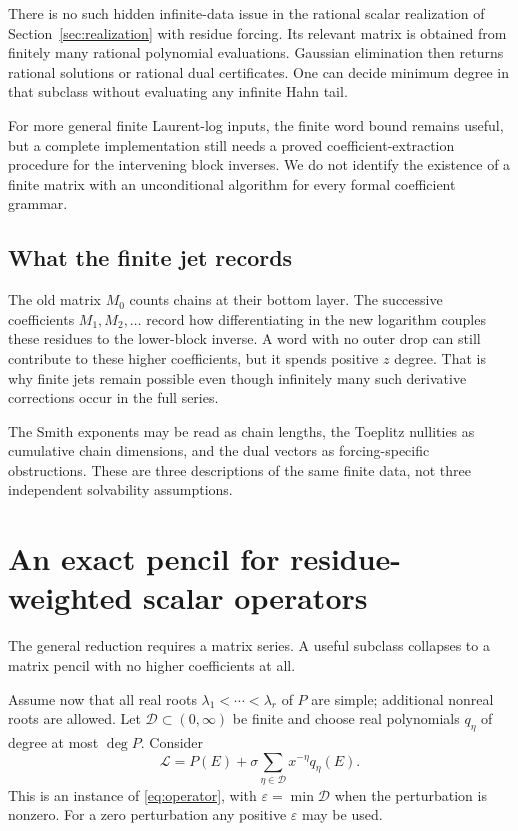 \documentclass[11pt,a4paper]{article}
\numberwithin{equation}{section}
\theoremstyle{definition}
\theoremstyle{remark}
\theoremstyle{definition}
\newcommand{\Ll}{\mathcal L}
\newcommand{\eps}{\varepsilon}
\begin{document}
There is no such hidden infinite-data issue in the rational scalar realization of Section~\ref{sec:realization} with residue forcing. Its relevant matrix is obtained from finitely many rational polynomial evaluations. Gaussian elimination then returns rational solutions or rational dual certificates. One can decide minimum degree in that subclass without evaluating any infinite Hahn tail.

For more general finite Laurent-log inputs, the finite word bound remains useful, but a complete implementation still needs a proved coefficient-extraction procedure for the intervening block inverses. We do not identify the existence of a finite matrix with an unconditional algorithm for every formal coefficient grammar.

\subsection{What the finite jet records}
The old matrix $M_0$ counts chains at their bottom layer. The successive coefficients $M_1,M_2,\ldots$ record how differentiating in the new logarithm couples these residues to the lower-block inverse. A word with no outer drop can still contribute to these higher coefficients, but it spends positive $z$ degree. That is why finite jets remain possible even though infinitely many such derivative corrections occur in the full series.

The Smith exponents may be read as chain lengths, the Toeplitz nullities as cumulative chain dimensions, and the dual vectors as forcing-specific obstructions. These are three descriptions of the same finite data, not three independent solvability assumptions.

\section{An exact pencil for residue-weighted scalar operators}
\label{sec:pencil}
The general reduction requires a matrix series. A useful subclass collapses to a matrix pencil with no higher coefficients at all.

Assume now that all real roots $\lambda_1<\cdots<\lambda_r$ of $P$ are simple; additional nonreal roots are allowed. Let $\mathcal D\subset(0,\infty)$ be finite and choose real polynomials $q_\eta$ of degree at most $\deg P$. Consider
\begin{equation}
 \Ll=P(E)+\sigma\sum_{\eta\in\mathcal D}x^{-\eta}q_\eta(E).
 \label{eq:residue-class}
\end{equation}
This is an instance of \eqref{eq:operator}, with $\eps=\min\mathcal D$ when the perturbation is nonzero. For a zero perturbation any positive $\eps$ may be used.
\end{document}
